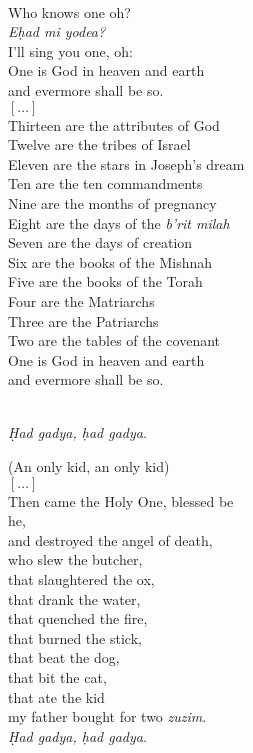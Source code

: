 \documentclass[a4paper,10pt,openany]{memoir}
\newcommand{\HgEllipsis}{\ensuremath{\left[\ldots\right]}}
\newenvironment{HgEnglish}{\strut\\\noindent}{\vspace{1em}}
\begin{document}
\noindent
\begin{minipage}{.45\textwidth}
\begin{HgEnglish}
Who knows one oh? \\
{\itshape E\d{h}ad mi yodea?} \\
I'll sing you one, oh: \\
One is God in heaven and earth \\
and evermore shall be so. \\
\HgEllipsis \\
Thirteen are the attributes of God \\
Twelve are the tribes of Israel \\
Eleven are the stars in Joseph's dream \\
Ten are the ten commandments \\
Nine are the months of pregnancy \\
Eight are the days of the {\itshape b'rit milah} \\
Seven are the days of creation \\
Six are the books of the Mishnah \\
Five are the books of the Torah \\
Four are the Matriarchs \\
Three are the Patriarchs \\
Two are the tables of the covenant \\
One is God in heaven and earth \\
and evermore shall be so.
\end{HgEnglish}
\end{minipage}
\hfill
\begin{minipage}{.45\textwidth}
\begin{HgEnglish}
{\itshape \d{H}ad gadya, \d{h}ad gadya}. \\
\strut \hfill (An only kid, an only kid) \\
\HgEllipsis \\
Then came the Holy One, blessed be \\
\vin he, \\
and destroyed the angel of death, \\
who slew the butcher, \\
that slaughtered the ox, \\
that drank the water, \\
that quenched the fire, \\
that burned the stick, \\
that beat the dog, \\
that bit the cat, \\
that ate the kid \\
my father bought for two {\itshape zuzim}. \\
{\itshape \d{H}ad gadya, \d{h}ad gadya}.
\end{HgEnglish}
\end{minipage}
\end{document}
